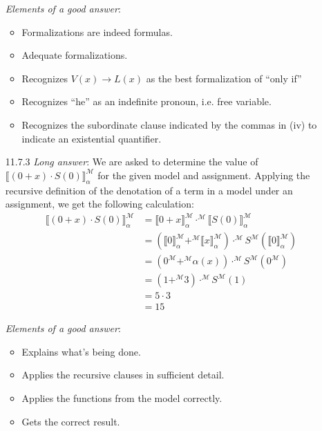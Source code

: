 \begin{itemize}
    \emph{Elements of a good answer}:

    \begin{itemize}
    \item Formalizations are indeed formulas.
    \item Adequate formalizations.
    \item Recognizes $V(x)\to L(x)$ as the best formalization of ``only
      if''
    \item Recognizes ``he'' as an indefinite pronoun, i.e. free
      variable.
      \item Recognizes the subordinate clause indicated by the commas
        in (iv) to indicate an existential quantifier.
    \end{itemize}

   \item[11.7.3] \emph{Long answer}: We are asked to determine the value of $\llbracket
     (0+x)\cdot S(0)\rrbracket^\mathcal{M}_\alpha$ for the given model
     and assignment. Applying the recursive definition of the
     denotation of a term in a model under an assignment, we get the
     following calculation:
     \begin{align*}
       \llbracket (0+x)\cdot
       S(0)\rrbracket^\mathcal{M}_\alpha&=\llbracket
                                          0+x\rrbracket^\mathcal{M}_\alpha\cdot^\mathcal{M} 
                                          \llbracket
                                          S(0)\rrbracket^\mathcal{M}_\alpha
       \\
       &=(\llbracket
         0\rrbracket^\mathcal{M}_\alpha+^\mathcal{M}\llbracket
         x\rrbracket^\mathcal{M}_\alpha)\cdot^\mathcal{M}
         S^\mathcal{M}(\llbracket 0\rrbracket^\mathcal{M}_\alpha)\\
                                        &=(0^\mathcal{M}+^\mathcal{M}\alpha(x))\cdot^\mathcal{M}S^\mathcal{M}(0^\mathcal{M})\\
                                        &=(1 +^\mathcal{M}3)\cdot ^\mathcal{M}S^\mathcal{M}(1)\\
                                        &= 5\cdot 3\\
                                        &=15
     \end{align*}

     \emph{Elements of a good answer}:

     \begin{itemize}
     \item Explains what's being done.
     \item Applies the recursive clauses in sufficient detail.
     \item Applies the functions from the model correctly.
     \item Gets the correct result.
     \end{itemize}


\end{itemize}
